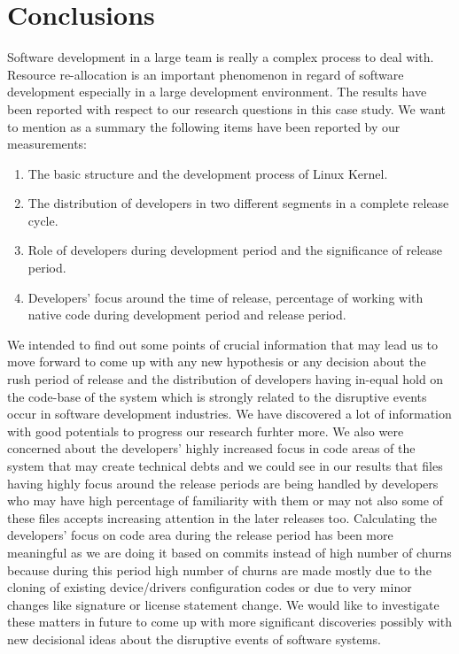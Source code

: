 \documentclass{acm_proc_article-sp}
\begin{document}
\section{Conclusions}
Software development in a large team is really a complex process to deal with. Resource re-allocation is an important phenomenon in regard of software development especially in a large development environment. The results have been reported with respect to our research questions in this case study. We want to mention as a summary the following items have been reported by our measurements:
\renewcommand{\labelenumi}{\theenumi.}
\begin{enumerate}
\item{The basic structure and the development process of Linux Kernel.}
\item{The distribution of developers in two different segments in a complete release cycle.}
\item{Role of developers during development period and the significance of release period.}
\item{Developers' focus around the time of release, percentage of working with native code during development period and release period.}
\end{enumerate}
We intended to find out some points of crucial information that may lead us to move forward to come up with any new hypothesis or any decision about the rush period of release and the distribution of developers having in-equal hold on the code-base of the system which is strongly related to the disruptive events occur in software development industries. We have discovered a lot of information with good potentials to progress our research furhter more. We also were concerned about the developers' highly increased focus in code areas of the system that may create technical debts and we could see in our results that files having highly focus around the release periods are being handled by developers who may have high percentage of familiarity with them or may not also some of these files accepts increasing attention in the later releases too. Calculating the developers' focus on code area during the release period has been more meaningful as we are doing it based on commits instead of high number of churns because during this period high number of churns are made mostly due to the cloning of existing device/drivers configuration codes or due to very minor changes like signature or license statement change. We would like to investigate these matters in future to come up with more significant discoveries possibly with new decisional ideas about the disruptive events of software systems.


 

\balancecolumns
\end{document}

